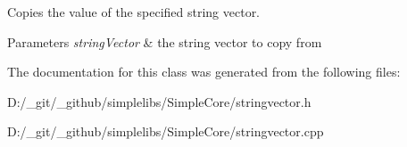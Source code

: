 Copies the value of the specified string vector. 


\begin{DoxyParams}{Parameters}
{\em string\+Vector} & the string vector to copy from \\
\hline
\end{DoxyParams}


The documentation for this class was generated from the following files\+:\begin{DoxyCompactItemize}
\item 
D\+:/\+\_\+git/\+\_\+github/simplelibs/\+Simple\+Core/stringvector.\+h\item 
D\+:/\+\_\+git/\+\_\+github/simplelibs/\+Simple\+Core/stringvector.\+cpp\end{DoxyCompactItemize}
